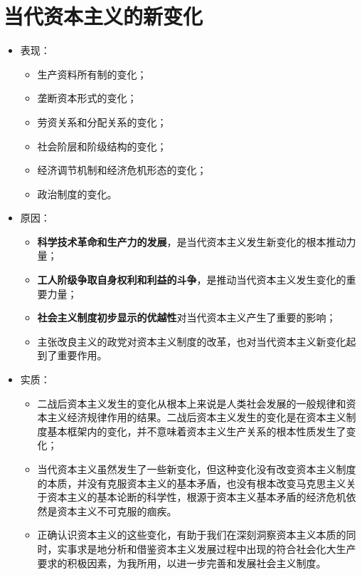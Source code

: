 \documentclass[12pt,openany]{ctexbook}
\begin{document}
\section{当代资本主义的新变化}
\begin{itemize}
  \item 表现：
\begin{itemize}
  \item 生产资料所有制的变化；
  \item 垄断资本形式的变化；
  \item 劳资关系和分配关系的变化；
  \item 社会阶层和阶级结构的变化；
  \item 经济调节机制和经济危机形态的变化；
  \item 政治制度的变化。
\end{itemize}
  \item 原因：
\begin{itemize}
  \item \textbf{科学技术革命和生产力的发展}，是当代资本主义发生新变化的根本推动力量；
  \item \textbf{工人阶级争取自身权利和利益的斗争}，是推动当代资本主义发生变化的重要力量；
  \item \textbf{社会主义制度初步显示的优越性}对当代资本主义产生了重要的影响；
  \item 主张改良主义的政党对资本主义制度的改革，也对当代资本主义新变化起到了重要作用。
\end{itemize}
  \item 实质：
\begin{itemize}
  \item 二战后资本主义发生的变化从根本上来说是人类社会发展的一般规律和资本主义经济规律作用的结果。二战后资本主义发生的变化是在资本主义制度基本框架内的变化，并不意味着资本主义生产关系的根本性质发生了变化；
  \item 当代资本主义虽然发生了一些新变化，但这种变化没有改变资本主义制度的本质，并没有克服资本主义的基本矛盾，也没有根本改变马克思主义关于资本主义的基本论断的科学性，根源于资本主义基本矛盾的经济危机依然是资本主义不可克服的痼疾。
  \item 正确认识资本主义的这些变化，有助于我们在深刻洞察资本主义本质的同时，实事求是地分析和借鉴资本主义发展过程中出现的符合社会化大生产要求的积极因素，为我所用，以进一步完善和发展社会主义制度。
\end{itemize}
\end{itemize}
\end{document}
